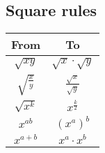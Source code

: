 \documentclass{article}
\begin{document}
\subsection{Square rules}
\begin{table}[H]
    \begin{tabular}{|c|c|}
    \hline
        \textbf{From} & \textbf{To} \\
    \hline
        \(\sqrt{xy}\) & \(\sqrt{x} \cdot \sqrt{y}\) \\
    \hline
        \(\sqrt{\frac{x}{y}}\) & \(\frac{\sqrt{x}}{\sqrt{y}}\) \\
    \hline
        \(\sqrt{x^k}\) & \(x^{\frac{k}{2}}\) \\
    \hline
        \(x^{ab}\) & \((x^a)^b\) \\
    \hline
        \(x^{a+b}\) & \(x^a \cdot x^b\) \\
    \hline
    \end{tabular}
\end{table}
\end{document}
